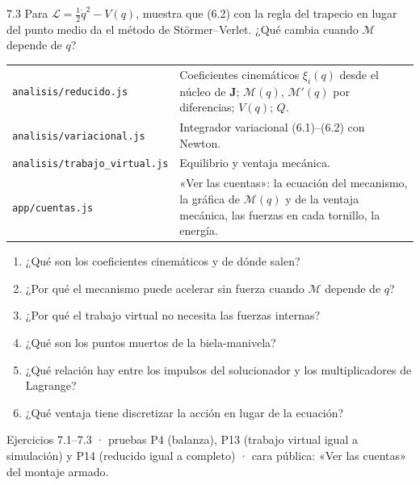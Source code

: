 \documentclass[11pt,a4paper]{article}
\begin{document}
\begin{ejercicio}{7.3}
Para $\mathcal L = \tfrac12\dot q^2 - V(q)$, muestra que (6.2) con la regla del trapecio en lugar del punto medio da el
método de Störmer–Verlet. ¿Qué cambia cuando $\mathcal M$ depende de $q$?
\end{ejercicio}

\begin{codigo}
\begin{tabularx}{\linewidth}{@{}l Y@{}}
\texttt{analisis/reducido.js} & Coeficientes cinemáticos $\xi_i(q)$ desde el núcleo de $\mathbf J$; $\mathcal M(q)$,
  $\mathcal M'(q)$ por diferencias; $V(q)$; $Q$.\\
\texttt{analisis/variacional.js} & Integrador variacional (6.1)--(6.2) con Newton.\\
\texttt{analisis/trabajo\_virtual.js} & Equilibrio y ventaja mecánica.\\
\texttt{app/cuentas.js} & «Ver las cuentas»: la ecuación del mecanismo, la gráfica de $\mathcal M(q)$ y de la
  ventaja mecánica, las fuerzas en cada tornillo, la energía.\\
\end{tabularx}
\end{codigo}

\begin{control}
\begin{enumerate}[leftmargin=*]
  \item ¿Qué son los coeficientes cinemáticos y de dónde salen?
  \item ¿Por qué el mecanismo puede acelerar sin fuerza cuando $\mathcal M$ depende de $q$?
  \item ¿Por qué el trabajo virtual no necesita las fuerzas internas?
  \item ¿Qué son los puntos muertos de la biela-manivela?
  \item ¿Qué relación hay entre los impulsos del solucionador y los multiplicadores de Lagrange?
  \item ¿Qué ventaja tiene discretizar la acción en lugar de la ecuación?
\end{enumerate}
\end{control}

\begin{cierre}
Ejercicios 7.1--7.3 · pruebas P4 (balanza), P13 (trabajo virtual igual a simulación) y P14 (reducido igual a
completo) · cara pública: «Ver las cuentas» del montaje armado.
\end{cierre}
\end{document}
